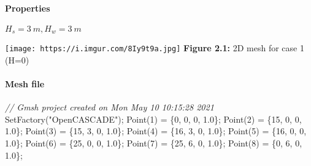 \documentclass[11pt]{article}
\newenvironment{Shaded}{}{}
\newcommand{\DecValTok}[1]{\textcolor[rgb]{0.25,0.63,0.44}{{#1}}}
\newcommand{\FloatTok}[1]{\textcolor[rgb]{0.25,0.63,0.44}{{#1}}}
\newcommand{\StringTok}[1]{\textcolor[rgb]{0.25,0.44,0.63}{{#1}}}
\newcommand{\CommentTok}[1]{\textcolor[rgb]{0.38,0.63,0.69}{\textit{{#1}}}}
\newcommand{\NormalTok}[1]{{#1}}
\newcommand{\OperatorTok}[1]{\textcolor[rgb]{0.40,0.40,0.40}{{#1}}}
\begin{document}
\hypertarget{properties-1}{%
\paragraph{Properties}\label{properties-1}}

\(H_s = 3\ m, H_w = 3\ m\)

\texttt{[image: https://i.imgur.com/8Iy9t9a.jpg]} \textbf{Figure 2.1:}
2D mesh for case 1 (H=0)

\hypertarget{mesh-file}{%
\paragraph{Mesh file}\label{mesh-file}}

\begin{Shaded}
\begin{Highlighting}[]
\CommentTok{// Gmsh project created on Mon May 10 10:15:28 2021}
\NormalTok{SetFactory}\OperatorTok{(}\StringTok{"OpenCASCADE"}\OperatorTok{);}
\NormalTok{Point}\OperatorTok{(}\DecValTok{1}\OperatorTok{)} \OperatorTok{=} \OperatorTok{\{}\DecValTok{0}\OperatorTok{,} \DecValTok{0}\OperatorTok{,} \DecValTok{0}\OperatorTok{,} \FloatTok{1.0}\OperatorTok{\};}
\NormalTok{Point}\OperatorTok{(}\DecValTok{2}\OperatorTok{)} \OperatorTok{=} \OperatorTok{\{}\DecValTok{15}\OperatorTok{,} \DecValTok{0}\OperatorTok{,} \DecValTok{0}\OperatorTok{,} \FloatTok{1.0}\OperatorTok{\};}
\NormalTok{Point}\OperatorTok{(}\DecValTok{3}\OperatorTok{)} \OperatorTok{=} \OperatorTok{\{}\DecValTok{15}\OperatorTok{,} \DecValTok{3}\OperatorTok{,} \DecValTok{0}\OperatorTok{,} \FloatTok{1.0}\OperatorTok{\};}
\NormalTok{Point}\OperatorTok{(}\DecValTok{4}\OperatorTok{)} \OperatorTok{=} \OperatorTok{\{}\DecValTok{16}\OperatorTok{,} \DecValTok{3}\OperatorTok{,} \DecValTok{0}\OperatorTok{,} \FloatTok{1.0}\OperatorTok{\};}
\NormalTok{Point}\OperatorTok{(}\DecValTok{5}\OperatorTok{)} \OperatorTok{=} \OperatorTok{\{}\DecValTok{16}\OperatorTok{,} \DecValTok{0}\OperatorTok{,} \DecValTok{0}\OperatorTok{,} \FloatTok{1.0}\OperatorTok{\};}
\NormalTok{Point}\OperatorTok{(}\DecValTok{6}\OperatorTok{)} \OperatorTok{=} \OperatorTok{\{}\DecValTok{25}\OperatorTok{,} \DecValTok{0}\OperatorTok{,} \DecValTok{0}\OperatorTok{,} \FloatTok{1.0}\OperatorTok{\};}
\NormalTok{Point}\OperatorTok{(}\DecValTok{7}\OperatorTok{)} \OperatorTok{=} \OperatorTok{\{}\DecValTok{25}\OperatorTok{,} \DecValTok{6}\OperatorTok{,} \DecValTok{0}\OperatorTok{,} \FloatTok{1.0}\OperatorTok{\};}
\NormalTok{Point}\OperatorTok{(}\DecValTok{8}\OperatorTok{)} \OperatorTok{=} \OperatorTok{\{}\DecValTok{0}\OperatorTok{,} \DecValTok{6}\OperatorTok{,} \DecValTok{0}\OperatorTok{,} \FloatTok{1.0}\OperatorTok{\};}

\end{Highlighting}
\end{Shaded}
\end{document}
